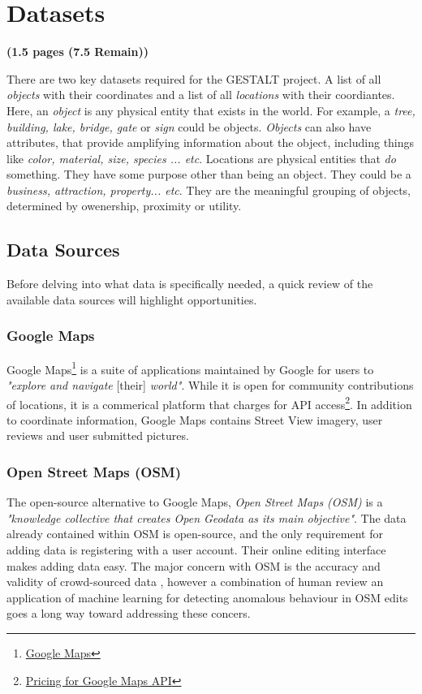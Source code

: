 \section{Datasets}
\label{section:datasets}
\textbf{(1.5 pages (7.5 Remain))}

There are two key datasets required for the GESTALT project. A list of all \textit{objects} with their coordinates and a list of all \textit{locations} with their coordiantes. 
Here, an \textit{object} is any physical entity that exists in the world. For example, a \textit{tree, building, lake, bridge, gate} or \textit{sign} could be objects.
\textit{Objects} can also have attributes, that provide amplifying information about the object, including things like \textit{color, material, size, species ... etc}. 
Locations are physical entities that \textit{do} something. They have some purpose other than being an object. They could be a \textit{business, attraction, property... etc}. They are the meaningful grouping of objects, determined by owenership, proximity or utility. 

\subsection{Data Sources}
Before delving into what data is specifically needed, a quick review of the available data sources will highlight opportunities. 

\subsubsection{Google Maps}
Google Maps\footnote{\href{https://www.google.com/maps/about/}{Google Maps}} is a suite of applications maintained by Google for users to \textit{"explore and navigate} [their] \textit{world"}. 
While it is open for community contributions of locations, it is a commerical platform that charges for API access\footnote{\href{https://mapsplatform.google.com/pricing/}{Pricing for Google Maps API}}. 
In addition to coordinate information, Google Maps contains Street View imagery, user reviews and user submitted pictures. 

\subsubsection{Open Street Maps (OSM)}
The open-source alternative to Google Maps, \textit{Open Street Maps (OSM)} is a \textit{"knowledge collective that creates Open Geodata as its main objective"}\cite{Haklay2008}. 
The data already contained within OSM is open-source, and the only requirement for adding data is registering with a user account. Their online editing interface makes adding data easy. 
The major concern with OSM is the accuracy and validity of crowd-sourced data \cite{VargasMunoz2020}, however a combination of human review an application of machine learning for detecting anomalous behaviour in OSM edits \cite{Mooney2017} goes a long way toward addressing these concers.  

